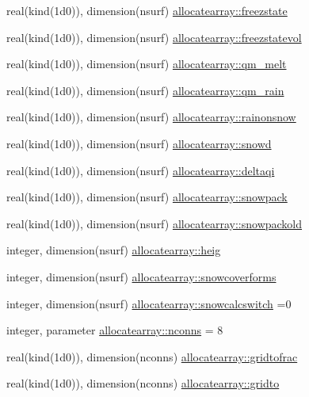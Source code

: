 \begin{DoxyCompactItemize}
\item 
real(kind(1d0)), dimension(nsurf) \hyperlink{namespaceallocatearray_af5b993a8153934d57f5a466152bdd625}{allocatearray\+::freezstate}
\item 
real(kind(1d0)), dimension(nsurf) \hyperlink{namespaceallocatearray_aaace92afa1f3dd88d1517345cbc9faba}{allocatearray\+::freezstatevol}
\item 
real(kind(1d0)), dimension(nsurf) \hyperlink{namespaceallocatearray_ad91b6e6a19469cd5c3a450fa56b031fa}{allocatearray\+::qm\+\_\+melt}
\item 
real(kind(1d0)), dimension(nsurf) \hyperlink{namespaceallocatearray_af875c3c6d435a8f1c4c5590f22d5ac61}{allocatearray\+::qm\+\_\+rain}
\item 
real(kind(1d0)), dimension(nsurf) \hyperlink{namespaceallocatearray_a7cebe6a894aabf8474a3a9d98dada68d}{allocatearray\+::rainonsnow}
\item 
real(kind(1d0)), dimension(nsurf) \hyperlink{namespaceallocatearray_af472b50234fe5d6af80ebf8a3b2a1863}{allocatearray\+::snowd}
\item 
real(kind(1d0)), dimension(nsurf) \hyperlink{namespaceallocatearray_aca62321fa80aef03d41d2ed66f3ade3a}{allocatearray\+::deltaqi}
\item 
real(kind(1d0)), dimension(nsurf) \hyperlink{namespaceallocatearray_a0c3675a79f0c6c3921beb95eb4d9d48f}{allocatearray\+::snowpack}
\item 
real(kind(1d0)), dimension(nsurf) \hyperlink{namespaceallocatearray_a57efc99803853059b05e3ad2f8c7b369}{allocatearray\+::snowpackold}
\item 
integer, dimension(nsurf) \hyperlink{namespaceallocatearray_a0d080c680eb400a8742276b57c625224}{allocatearray\+::heig}
\item 
integer, dimension(nsurf) \hyperlink{namespaceallocatearray_aa5bce865502bab8845c8ce638efee764}{allocatearray\+::snowcoverforms}
\item 
integer, dimension(nsurf) \hyperlink{namespaceallocatearray_ae1fb990049408fe1fa4f557577937ed6}{allocatearray\+::snowcalcswitch} =0
\item 
integer, parameter \hyperlink{namespaceallocatearray_a420c0415ef0d070ce0b1c598ace0b0a4}{allocatearray\+::nconns} = 8
\item 
real(kind(1d0)), dimension(nconns) \hyperlink{namespaceallocatearray_a07eae9a32f308646702ed56a2d5c345a}{allocatearray\+::gridtofrac}
\item 
real(kind(1d0)), dimension(nconns) \hyperlink{namespaceallocatearray_a48e0ebcd7ec31deaddaf32352c02e180}{allocatearray\+::gridto}

\end{DoxyCompactItemize}

